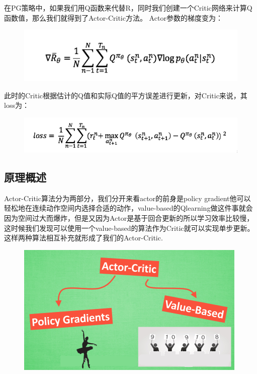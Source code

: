 \documentclass[UTF8,a4paper,12pt]{ctexbook}
\begin{document}
		在PG策略中，如果我们用Q函数来代替R，同时我们创建一个Critic网络来计算Q函数值，那么我们就得到了Actor-Critic方法。
		Actor参数的梯度变为：
		
		\begin{figure}[H]
		\centering
		\includegraphics[width=.9\linewidth]{PG06}
		\end{figure}		
		
		此时的Critic根据估计的Q值和实际Q值的平方误差进行更新，对Critic来说，其loss为：
		
		\begin{figure}[H]
		\centering
		\includegraphics[width=.9\linewidth]{PG07}
		\end{figure}		
		
		
		
		\subsection{原理概述}
			Actor-Critic算法分为两部分，我们分开来看actor的前身是policy gradient他可以轻松地在连续动作空间内选择合适的动作，value-based的Qlearning做这件事就会因为空间过大而爆炸，但是又因为Actor是基于回合更新的所以学习效率比较慢，这时候我们发现可以使用一个value-based的算法作为Critic就可以实现单步更新。这样两种算法相互补充就形成了我们的Actor-Critic.
	
			\begin{figure}[H]
				\centering
				\includegraphics[width=.9\linewidth]{Actor-Critic}
			\end{figure}			
			
\end{document}
